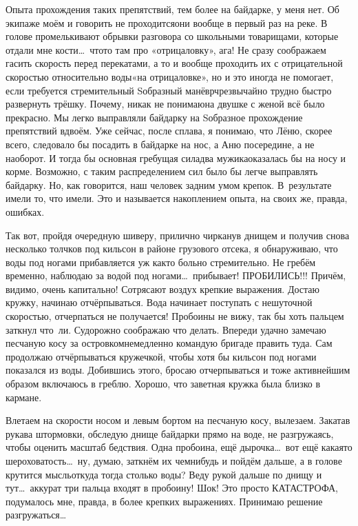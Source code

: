 Опыта прохождения таких препятствий, тем более на байдарке, у меня нет. Об экипаже моём и говорить не проходится\mdash они вообще в первый раз на реке. В голове промелькивают обрывки разговора со школьными товарищами, которые отдали мне кости\ldots~что\sdash то там про «отрицаловку», ага! Не сразу соображаем гасить скорость перед перекатами, а то и вообще проходить их с отрицательной скоростью относительно воды\mdash «на отрицаловке», но и это иногда не помогает, если требуется стремительный S\sdash образный манёвр\mdash чрезвычайно трудно быстро развернуть трёшку. Почему, никак не понимаю\mdash на двушке с женой всё было прекрасно. Мы легко выправляли байдарку на S\sdash образное прохождение препятствий вдвоём. Уже сейчас, после сплава, я понимаю, что Лёню, скорее всего, следовало бы посадить в байдарке на нос, а Аню посередине, а не наоборот. И тогда бы основная гребущая сила\mdash два мужика\mdash оказалась бы на носу и корме. Возможно, с таким распределением сил было бы легче выправлять байдарку. Но, как говорится, наш человек задним умом крепок. В~результате имели то, что имели. Это и называется накоплением опыта, на своих же, правда, ошибках.

Так вот, пройдя очередную шиверу, прилично чирканув днищем и получив снова несколько толчков под кильсон в районе грузового отсека, я обнаруживаю, что воды под ногами прибавляется уж как\sdash то больно стремительно. Не гребём временно, наблюдаю за водой под ногами\ldots~прибывает! ПРОБИЛИСЬ!!! Причём, видимо, очень капитально! Сотрясают воздух крепкие выражения. Достаю кружку, начинаю отчёрпываться. Вода начинает поступать с нешуточной скоростью, отчерпаться не получается! Пробоины не вижу, так бы хоть пальцем заткнул что~ли. Судорожно соображаю что делать. Впереди удачно замечаю песчаную косу за островком\mdash немедленно командую бригаде править туда. Сам продолжаю отчёрпываться кружечкой, чтобы хотя бы кильсон под ногами показался из воды. Добившись этого, бросаю отчерпываться и тоже активнейшим образом включаюсь в греблю. Хорошо, что заветная кружка была близко в кармане.

Влетаем на скорости носом и левым бортом на песчаную косу, вылезаем. Закатав рукава штормовки, обследую днище байдарки прямо на воде, не разгружаясь, чтобы оценить масштаб бедствия. Одна пробоина, ещё дырочка\ldots~вот ещё какая\sdash то шероховатость\ldots~ну, думаю, заткнём их чем\sdash нибудь и пойдём дальше, а в голове крутится мысль\mdash откуда тогда столько воды? Веду рукой дальше по днищу и тут\ldots~аккурат три пальца входят в пробоину! Шок! Это просто КАТАСТРОФА, подумалось мне, правда, в более крепких выражениях. Принимаю решение разгружаться\ldots~

